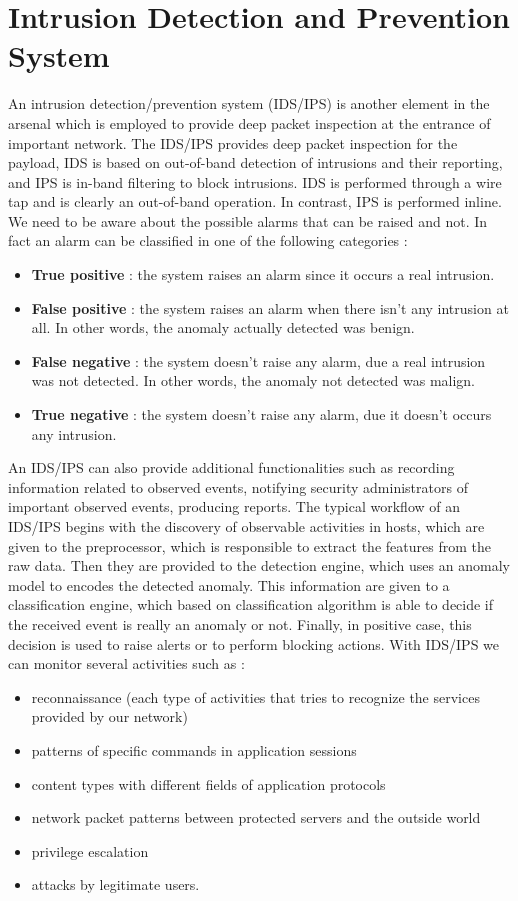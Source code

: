 \documentclass[11pt]{article}
\begin{document}
\section{Intrusion Detection and Prevention System}
An intrusion detection/prevention system (IDS/IPS) is another element in the arsenal which is employed to provide deep packet inspection at the entrance of important network. The IDS/IPS provides deep packet inspection for the payload, IDS is based on out-of-band detection of intrusions and their reporting, and IPS is in-band filtering to block intrusions. IDS is performed through a wire tap and is clearly an out-of-band operation. In contrast, IPS is performed inline. We need to be aware about the possible alarms that can be raised and not. In fact an alarm can be classified in one of the following categories :
\begin{itemize}
\item \textbf{True positive} : the system raises an alarm since it occurs a real intrusion.
\item \textbf{False positive} : the system raises an alarm when there isn't any intrusion at all. In other words, the anomaly actually detected was benign.
\item \textbf{False negative} : the system doesn't raise any alarm, due a real intrusion was not detected. In other words, the anomaly not detected was malign.
\item \textbf{True negative} : the system doesn't raise any alarm, due it doesn't occurs any intrusion.
\end{itemize}
An IDS/IPS can also provide additional functionalities such as recording information related to observed events, notifying security administrators of important observed events, producing reports. The typical workflow of an IDS/IPS begins with the discovery of observable activities in hosts, which are given to the preprocessor, which is responsible to extract the features from the raw data. Then they are provided to the detection engine, which uses an anomaly model to encodes the detected anomaly.
This information are given to a classification engine, which based on classification algorithm is able to decide if the received event is really an anomaly or not. Finally, in positive case, this decision is used to raise alerts or to perform blocking actions. With IDS/IPS we can monitor several activities such as :
\begin{itemize}
\item reconnaissance (each type of activities that tries to recognize the services provided by our network)
\item patterns of specific commands in application sessions
\item content types with different fields of application protocols
\item network packet patterns between protected servers and the outside world
\item privilege escalation
\item attacks by legitimate users.
\end{itemize}
\end{document}
